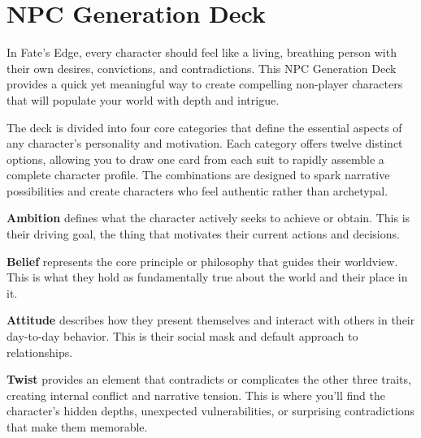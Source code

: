 






















\section{NPC Generation Deck}

In Fate's Edge, every character should feel like a living, breathing person with their own desires, convictions, and contradictions. This NPC Generation Deck provides a quick yet meaningful way to create compelling non-player characters that will populate your world with depth and intrigue.

The deck is divided into four core categories that define the essential aspects of any character's personality and motivation. Each category offers twelve distinct options, allowing you to draw one card from each suit to rapidly assemble a complete character profile. The combinations are designed to spark narrative possibilities and create characters who feel authentic rather than archetypal.

\textbf{Ambition} defines what the character actively seeks to achieve or obtain. This is their driving goal, the thing that motivates their current actions and decisions.

\textbf{Belief} represents the core principle or philosophy that guides their worldview. This is what they hold as fundamentally true about the world and their place in it.

\textbf{Attitude} describes how they present themselves and interact with others in their day-to-day behavior. This is their social mask and default approach to relationships.

\textbf{Twist} provides an element that contradicts or complicates the other three traits, creating internal conflict and narrative tension. This is where you'll find the character's hidden depths, unexpected vulnerabilities, or surprising contradictions that make them memorable.

